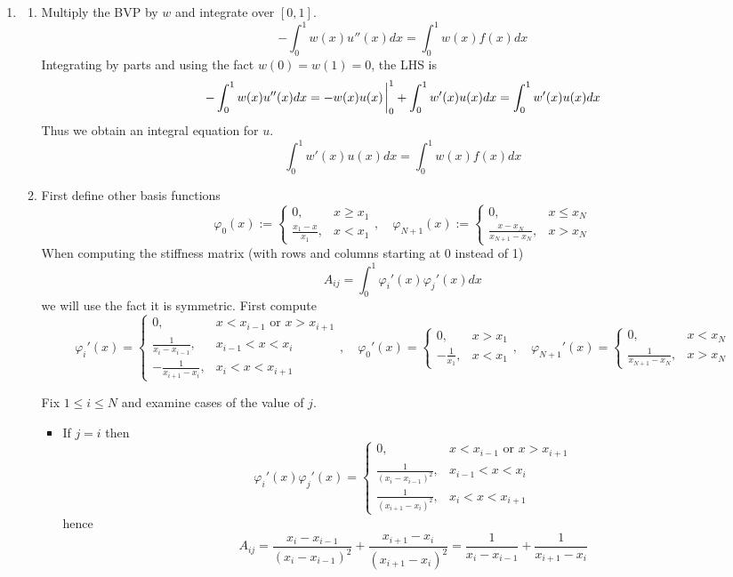 \documentclass{article}
\newcommand{\vp}{\varphi}
\begin{document}
\begin{enumerate}
\item

\begin{enumerate}
	
	
	\item Multiply the BVP by $w$ and integrate over $[0,1]$.
	\[-\int_0^1 w(x)u''(x)dx = \int_0^1 w(x)f(x)dx\]
	Integrating by parts and using the fact $w(0)=w(1)=0$, the LHS is
	\[-\int_0^1 w(x)u''(x)dx = -w(x)u(x)\eval_0^1 + \int_0^1 w'(x)u(x)dx = \int_0^1 w'(x)u(x)dx\]
	Thus we obtain an integral equation for $u$.
	\[\int_0^1 w'(x)u(x)dx = \int_0^1 w(x)f(x)dx\]
	
	
	\item First define other basis functions
	$$\vp_0(x) :=
	\begin{cases}
		0, & x\ge x_1\\
		\frac{x_1-x}{x_1}, & x<x_1
	\end{cases},
	\quad \vp_{N+1}(x) :=
	\begin{cases}
		0, & x\le x_N\\
		\frac{x-x_N}{x_{N+1}-x_N}, & x>x_N
	\end{cases}$$
	When computing the stiffness matrix (with rows and columns starting at 0 instead of 1)
	$$A_{ij} = \int_0^1\vp_i'(x)\vp_j'(x)dx$$
	we will use the fact it is symmetric. First compute
	$$\vp_i'(x) =
	\begin{cases}
		0, & x<x_{i-1} \text{ or } x>x_{i+1}\\
		\frac{1}{x_i-x_{i-1}}, & x_{i-1}<x<x_i\\
		-\frac{1}{x_{i+1}-x_i}, & x_i<x<x_{i+1}
	\end{cases},
	\quad \vp_0'(x) =
	\begin{cases}
		0, & x>x_1\\
		-\frac{1}{x_1}, & x<x_1
	\end{cases},
	\quad \vp_{N+1}'(x) =
	\begin{cases}
		0, & x<x_N\\
		\frac{1}{x_{N+1}-x_N}, & x>x_N
	\end{cases}$$
	
	
	Fix $1\le i\le N$ and examine cases of the value of $j$.
	
	\begin{itemize}
		
		\item If $j=i$ then
		$$\vp_i'(x)\vp_j'(x) =
		\begin{cases}
			0, & x< x_{i-1} \text{ or } x> x_{i+1}\\
			\frac{1}{(x_i-x_{i-1})^2}, & x_{i-1}<x<x_i\\
			\frac{1}{(x_{i+1}-x_i)^2}, & x_i<x<x_{i+1}
		\end{cases}$$
		hence
		$$A_{ij} = \frac{x_i-x_{i-1}}{(x_i-x_{i-1})^2} + \frac{x_{i+1}-x_i}{(x_{i+1}-x_i)^2}
		= \frac{1}{x_i-x_{i-1}} + \frac{1}{x_{i+1}-x_i}$$
		

\end{itemize}
\end{enumerate}
\end{enumerate}
\end{document}
